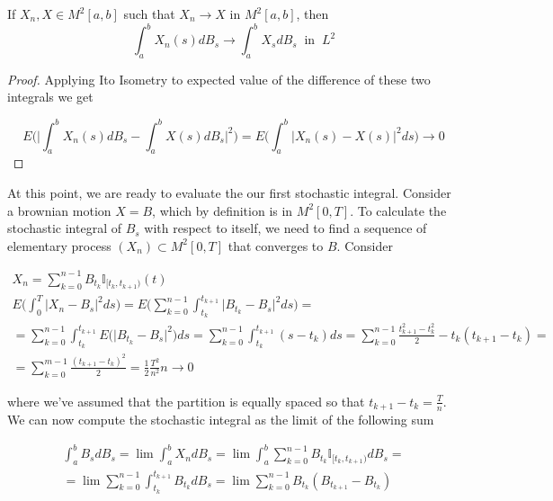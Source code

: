 \begin{corollary}
    If $X_n,X \in M^2[a,b]$ such that $X_n \to X$ in $M^2[a,b]$, then 
    \begin{equation*}
        \int_a^b X_n(s) dB_s \to \int_a^b X_s dB_s \;\; \text{in} \;\; L^2
    \end{equation*}
\end{corollary}
\begin{proof}
    Applying Ito Isometry to expected value of the difference of these two integrals we get

    \begin{equation*}
        E\Bigg( \Bigg\vert \int_a^b X_n(s) dB_s - \int_a^b X(s) dB_s \Bigg\vert^2 \Bigg) = E\Bigg( \int_a^b \vert X_n(s) - X(s) \vert^2 ds \Bigg) \to 0 
    \end{equation*}
\end{proof}

At this point, we are ready to evaluate the our first stochastic integral. Consider a brownian motion $X = B$, which by definition is in $M^2[0,T]$. To calculate the stochastic integral of $B_s$ with respect to itself, we need to find a sequence of elementary process $(X_n) \subset M^2[0,T]$ that converges to $B$. Consider

\begin{gather*}
    X_n = \sum_{k=0}^{n-1} B_{t_k} \mathbb{I}_{[t_k,t_{k+1})} (t) \\
    E\Bigg( \int_0^T \vert X_n - B_s \vert^2 ds \Bigg) = E\Bigg( \sum_{k=0}^{n-1} \int_{t_k}^{t_{k+1}} \vert B_{t_k} - B_s \vert^2 ds \Bigg) = \\
    = \sum_{k=0}^{n-1} \int_{t_k}^{t_{k+1}} E\Big( \vert B_{t_k} - B_s \vert^2 \Big) ds = \sum_{k=0}^{n-1} \int_{t_k}^{t_{k+1}} (s - t_k) ds = \sum_{k=0}^{n-1} \frac{t_{k+1}^2-t_k^2}{2}-t_k(t_{k+1}-t_k) = \\
    = \sum_{k=0}^{m-1} \frac{(t_{k+1}-t_k)^2}{2} = \frac{1}{2} \frac{T^2}{n^2}n \to 0
\end{gather*}

where we've assumed that the partition is equally spaced so that $t_{k+1}-t_k = \frac{T}{n}$. We can now compute the stochastic integral as the limit of the following sum

\begin{gather*}
    \int_a^b B_s dB_s = \lim \int_a^b X_n dB_s = \lim \int_a^b \sum_{k=0}^{n-1} B_{t_k} \mathbb{I}_{[t_k,t_{k+1})} dB_s =\\
    = \lim \sum_{k=0}^{n-1} \int_{t_k}^{t_{k+1}} B_{t_k} dB_s = \lim \sum_{k=0}^{n-1} B_{t_k} (B_{t_{k+1}}-B_{t_k})
\end{gather*}

